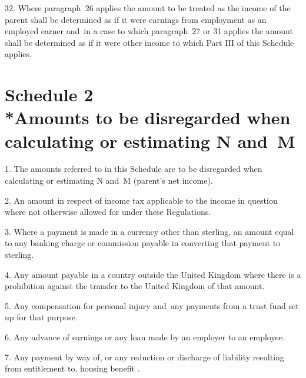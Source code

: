\documentclass[12pt,a4paper]{article}
\begin{document}

\medskip

32.  Where paragraph~26 applies the amount to be treated as the income of the parent shall be determined as if it were earnings from employment as an employed earner and~in a case to which paragraph~27 or 31 applies the amount shall be determined as if it were other income to which Part III of this Schedule applies.

\part[Schedule 2 --- Amounts to be disregarded when calculating or estimating N and~M]{Schedule 2\\*Amounts to be disregarded when calculating or estimating N and~M}

\renewcommand\parthead{--- Schedule 2}

1.  The amounts referred to in this Schedule are to be disregarded when calculating or estimating N and~M (parent’s net income).

\medskip

2.  An amount in respect of income tax applicable to the income in question where not otherwise allowed for under these Regulations.

\medskip

3.  Where a payment is made in a currency other than sterling, an amount equal to any banking charge or commission payable in converting that payment to sterling.

\medskip

4.  Any amount payable in a country outside the United Kingdom where there is a prohibition against the transfer to the United Kingdom of that amount.

\medskip

5.  Any compensation for personal injury and~any payments from a trust fund set up for that purpose.

\medskip

6.  Any advance of earnings or any loan made by an employer to an employee.

\medskip

7.  Any payment by way of, or any reduction or discharge of liability resulting from entitlement to, housing benefit%
.
\end{document}
